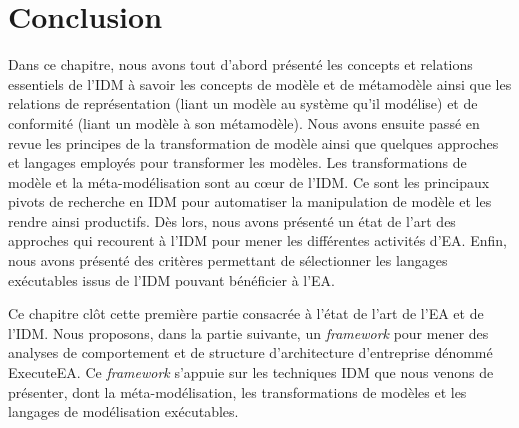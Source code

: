\section{Conclusion}

Dans ce chapitre, nous avons tout d'abord présenté les concepts et relations essentiels de l'IDM
à savoir les concepts de modèle et de métamodèle ainsi que les relations de représentation (liant un modèle au système qu'il modélise)
et de conformité (liant un modèle à son métamodèle).
Nous avons ensuite passé en revue les principes de la transformation de modèle ainsi que quelques approches et langages
employés pour transformer les modèles. Les transformations de modèle et la méta-modélisation sont au cœur de l'IDM. Ce sont
les principaux pivots de recherche en IDM pour automatiser la manipulation de modèle et les rendre ainsi productifs. Dès lors,
nous avons présenté un état de l'art des approches qui recourent à l'IDM pour mener les différentes activités d'EA.
Enfin, nous avons présenté des critères permettant de sélectionner les langages exécutables issus de l'IDM pouvant bénéficier à l'EA.

Ce chapitre clôt cette première partie consacrée à l'état de l'art de l'EA et de l'IDM. Nous proposons, dans la partie suivante,
un \emph{framework} pour mener des analyses de comportement et de structure d'architecture d'entreprise dénommé ExecuteEA.
Ce \emph{framework} s'appuie sur les techniques IDM que nous venons de présenter, dont la méta-modélisation, les transformations
de modèles et les langages de modélisation exécutables.














